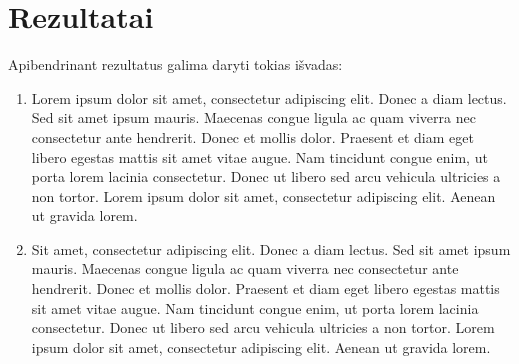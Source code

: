 \section{Rezultatai}

Apibendrinant rezultatus galima daryti tokias išvadas:
\begin{enumerate}
    \item Lorem ipsum dolor sit amet, consectetur adipiscing elit. Donec a diam lectus. Sed sit amet ipsum mauris. Maecenas congue ligula ac quam viverra nec consectetur ante hendrerit. Donec et mollis dolor. Praesent et diam eget libero egestas mattis sit amet vitae augue. Nam tincidunt congue enim, ut porta lorem lacinia consectetur. Donec ut libero sed arcu vehicula ultricies a non tortor. Lorem ipsum dolor sit amet, consectetur adipiscing elit. Aenean ut gravida lorem.
    \item Sit amet, consectetur adipiscing elit. Donec a diam lectus. Sed sit amet ipsum mauris. Maecenas congue ligula ac quam viverra nec consectetur ante hendrerit. Donec et mollis dolor. Praesent et diam eget libero egestas mattis sit amet vitae augue. Nam tincidunt congue enim, ut porta lorem lacinia consectetur. Donec ut libero sed arcu vehicula ultricies a non tortor. Lorem ipsum dolor sit amet, consectetur adipiscing elit. Aenean ut gravida lorem.

\end{enumerate}

\newpage